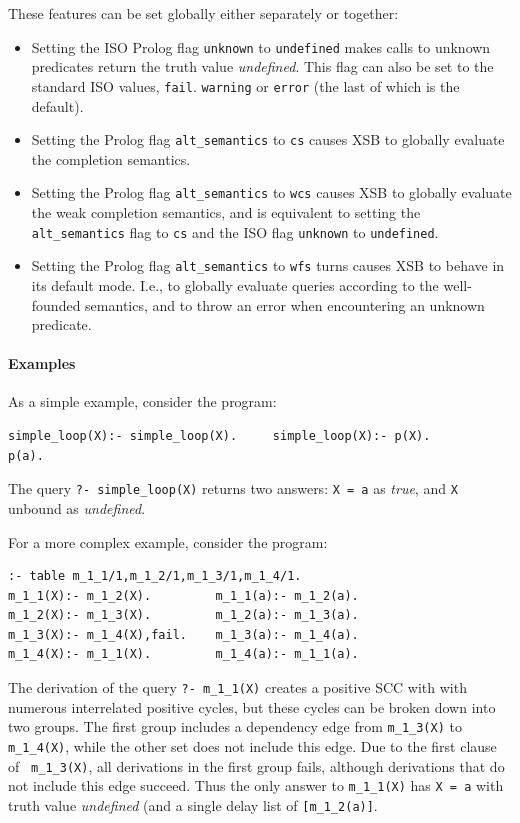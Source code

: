 
These features can be set globally either separately or together:

\begin{itemize}
\item Setting the ISO Prolog flag {\tt unknown} to {\tt undefined}
  makes calls to unknown predicates return the truth value {\em
    undefined}.  This flag can also be set to the standard ISO values,
  {\tt fail}. {\tt warning} or {\tt error} (the last of which is the
    default).
\item Setting the Prolog flag {\tt alt\_semantics} to {\tt cs} causes
  XSB to globally evaluate the completion semantics.
\item Setting the Prolog flag {\tt alt\_semantics} to {\tt wcs} causes
  XSB to globally evaluate the weak completion semantics, and is
  equivalent to setting the {\tt alt\_semantics} flag to {\tt cs} and
  the ISO flag {\tt unknown} to {\tt undefined}.
\item Setting the Prolog flag {\tt alt\_semantics} to {\tt wfs} turns
  causes XSB to behave in its default mode.  I.e., to globally
  evaluate queries according to the well-founded semantics, and to
  throw an error when encountering an unknown predicate.
\end{itemize}

\paragraph{Examples}

As a simple example, consider the program:
\begin{verbatim}
simple_loop(X):- simple_loop(X).     simple_loop(X):- p(X).
p(a).
\end{verbatim}
The query {\tt ?- simple\_loop(X)} returns two answers: {\tt X = a} as
{\em true}, and {\tt X} unbound as {\em undefined}.

For a more complex example, consider the program:
\begin{verbatim}
:- table m_1_1/1,m_1_2/1,m_1_3/1,m_1_4/1.
m_1_1(X):- m_1_2(X).         m_1_1(a):- m_1_2(a).
m_1_2(X):- m_1_3(X).         m_1_2(a):- m_1_3(a).         
m_1_3(X):- m_1_4(X),fail.    m_1_3(a):- m_1_4(a).
m_1_4(X):- m_1_1(X).         m_1_4(a):- m_1_1(a).
\end{verbatim}
%
The derivation of the query {\tt ?- m\_1\_1(X)} creates a positive SCC
with with numerous interrelated positive cycles, but these cycles can
be broken down into two groups.  The first group includes a dependency
edge from {\tt m\_1\_3(X)} to {\tt m\_1\_4(X)}, while the other set
does not include this edge.  Due to the first clause of {\tt
  m\_1\_3(X)}, all derivations in the first group fails, although
derivations that do not include this edge succeed.  Thus the only
answer to {\tt m\_1\_1(X)} has {\tt X = a} with truth value {\em
  undefined} (and a single delay list of {\tt [m\_1\_2(a)]}.

